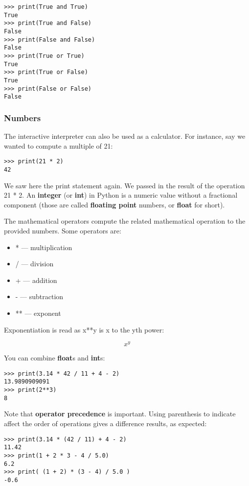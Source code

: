 \begin{verbatim}
>>> print(True and True)
True
>>> print(True and False)
False
>>> print(False and False)
False
>>> print(True or True)
True
>>> print(True or False)
True
>>> print(False or False)
False
\end{verbatim}

\subsubsection{Numbers}\label{numbers}

The interactive interpreter can also be used as a calculator. For
instance, say we wanted to compute a multiple of 21:

\begin{verbatim}
>>> print(21 * 2)
42
\end{verbatim}

We saw here the print statement again. We passed in the result of the
operation 21 * 2. An \textbf{integer} (or \textbf{int}) in Python is a
numeric value without a fractional component (those are called
\textbf{floating point} numbers, or \textbf{float} for short).

The mathematical operators compute the related mathematical operation to
the provided numbers. Some operators are:

\begin{itemize}
\tightlist
\item
  * --- multiplication
\item
  / --- division
\item
  + --- addition
\item
  - --- subtraction
\item
  ** --- exponent
\end{itemize}

Exponentiation is read as x**y is x to the yth power:

\[x^y\]

You can combine \textbf{float}s and \textbf{int}s:

\begin{verbatim}
>>> print(3.14 * 42 / 11 + 4 - 2)
13.9890909091
>>> print(2**3)
8
\end{verbatim}

Note that \textbf{operator precedence} is important. Using parenthesis
to indicate affect the order of operations gives a difference results,
as expected:

\begin{verbatim}
>>> print(3.14 * (42 / 11) + 4 - 2)
11.42
>>> print(1 + 2 * 3 - 4 / 5.0)
6.2
>>> print( (1 + 2) * (3 - 4) / 5.0 )
-0.6
\end{verbatim}

